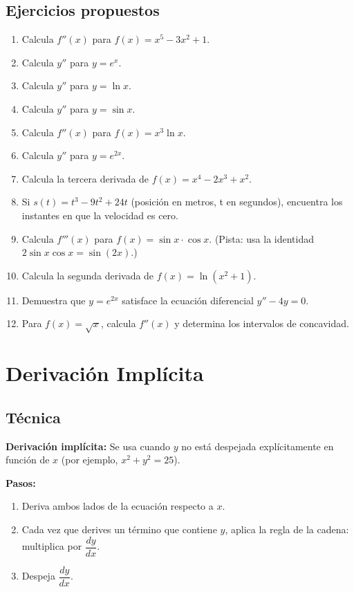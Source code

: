 \documentclass[12pt, letterpaper]{article}
\begin{document}
\subsection{Ejercicios propuestos}

\begin{enumerate}[resume=ejercicios, leftmargin=*]
  \item \facil{} Calcula $f''(x)$ para $f(x) = x^5 - 3x^2 + 1$.
  \item \facil{} Calcula $y''$ para $y = e^x$.
  \item \facil{} Calcula $y''$ para $y = \ln x$.
  \item \facil{} Calcula $y''$ para $y = \sin x$.
  \item \medio{} Calcula $f''(x)$ para $f(x) = x^3 \ln x$.
  \item \medio{} Calcula $y''$ para $y = e^{2x}$.
  \item \medio{} Calcula la tercera derivada de $f(x) = x^4 - 2x^3 + x^2$.
  \item \medio{} Si $s(t) = t^3 - 9t^2 + 24t$ (posición en metros, t en segundos), encuentra los instantes en que la velocidad es cero.
  \item \dificil{} Calcula $f'''(x)$ para $f(x) = \sin x \cdot \cos x$. (Pista: usa la identidad $2\sin x\cos x = \sin(2x)$.)
  \item \dificil{} Calcula la segunda derivada de $f(x) = \ln(x^2 + 1)$.
  \item \dificil{} Demuestra que $y = e^{2x}$ satisface la ecuación diferencial $y'' - 4y = 0$.
  \item \dificil{} Para $f(x) = \sqrt{x}$, calcula $f''(x)$ y determina los intervalos de concavidad.
\end{enumerate}

\newpage


\section{Derivación Implícita}

\subsection{Técnica}

\begin{cuadroteoria}
  \textbf{Derivación implícita:} Se usa cuando $y$ no está despejada explícitamente en función de $x$ (por ejemplo, $x^2 + y^2 = 25$).

  \textbf{Pasos:}
  \begin{enumerate}[leftmargin=*]
    \item Deriva ambos lados de la ecuación respecto a $x$.
    \item Cada vez que derives un término que contiene $y$, aplica la regla de la cadena: multiplica por $\dfrac{dy}{dx}$.
    \item Despeja $\dfrac{dy}{dx}$.
  \end{enumerate}
\end{cuadroteoria}
\end{document}
